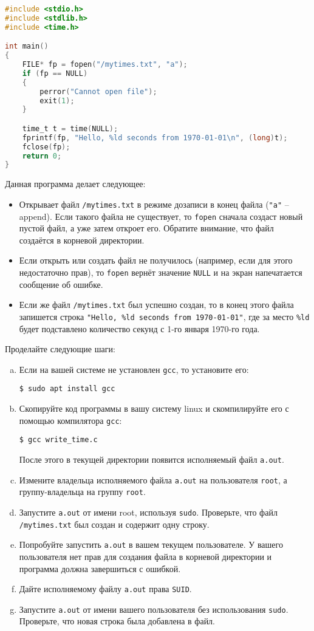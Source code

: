\documentclass{article}
\begin{document}
\lstset{style=csMiptCStyle}
\begin{lstlisting}[language=C]
#include <stdio.h>
#include <stdlib.h>
#include <time.h>

int main()
{
    FILE* fp = fopen("/mytimes.txt", "a");
    if (fp == NULL)
    {
        perror("Cannot open file");
        exit(1);
    }

    time_t t = time(NULL);
    fprintf(fp, "Hello, %ld seconds from 1970-01-01\n", (long)t);
    fclose(fp);
    return 0;
}
\end{lstlisting}
\lstset{style=csMiptBash}
Данная программа делает следующее:
\begin{itemize}
\item Открывает файл \texttt{/mytimes.txt} в режиме дозаписи в конец файла (\texttt{"a"} -- append). Если такого файла не существует, то \texttt{fopen} сначала создаст новый пустой файл, а уже затем откроет его. Обратите внимание, что файл создаётся в корневой директории.
\item Если открыть или создать файл не получилось (например, если для этого недостаточно прав), то \texttt{fopen} вернёт значение \texttt{NULL} и на экран напечатается сообщение об ошибке.
\item Если же файл \texttt{/mytimes.txt} был успешно создан, то в конец этого файла запишется строка \texttt{"Hello, \%ld seconds from 1970-01-01"}, где за место \texttt{\%ld} будет подставлено количество секунд с 1-го января 1970-го года.
\end{itemize}
Проделайте следующие шаги:
\begin{enumerate}[(a)]
\item Если на вашей системе не установлен \texttt{gcc}, то установите его:
\begin{lstlisting}
$ sudo apt install gcc
\end{lstlisting}

\item Скопируйте код программы в вашу систему linux и скомпилируйте его с помощью компилятора \texttt{gcc}:
\begin{lstlisting}
$ gcc write_time.c
\end{lstlisting}
После этого в текущей директории появится исполняемый файл \texttt{a.out}.

\item Измените владельца исполняемого файла \texttt{a.out} на пользователя \texttt{root}, а группу-владельца на группу \texttt{root}. 
\item Запустите \texttt{a.out} от имени root, используя \texttt{sudo}. Проверьте, что файл \texttt{/mytimes.txt} был создан и содержит одну строку.
\item Попробуйте запустить \texttt{a.out} в вашем текущем пользователе. У вашего пользователя нет прав для создания файла в корневой директории и программа должна завершиться с ошибкой.
\item Дайте исполняемому файлу \texttt{a.out} права \texttt{SUID}.
\item Запустите \texttt{a.out} от имени вашего пользователя без использования \texttt{sudo}. Проверьте, что новая строка была добавлена в файл.
\end{enumerate}
\end{document}
